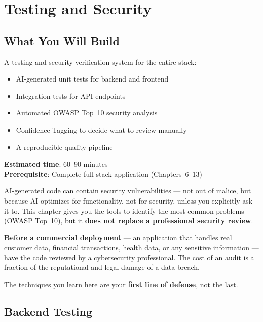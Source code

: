 \chapter{Testing and Security}

\section*{What You Will Build}
A testing and security verification system for the entire stack:
\begin{itemize}
  \item AI-generated unit tests for backend and frontend
  \item Integration tests for API endpoints
  \item Automated OWASP Top~10 security analysis
  \item Confidence Tagging to decide what to review manually
  \item A reproducible quality pipeline
\end{itemize}

\textbf{Estimated time}: 60--90 minutes\\
\textbf{Prerequisite}: Complete full-stack application (Chapters~6--13)

\begin{dangerbox}[title={Security Is Not Optional}]
AI-generated code can contain security vulnerabilities --- not out of malice, but because AI optimizes for functionality, not for security, unless you explicitly ask it to. This chapter gives you the tools to identify the most common problems (OWASP Top~10), but it \textbf{does not replace a professional security review}.

\textbf{Before a commercial deployment} --- an application that handles real customer data, financial transactions, health data, or any sensitive information --- have the code reviewed by a cybersecurity professional. The cost of an audit is a fraction of the reputational and legal damage of a data breach.

The techniques you learn here are your \textbf{first line of defense}, not the last.
\end{dangerbox}

\section{Backend Testing}

